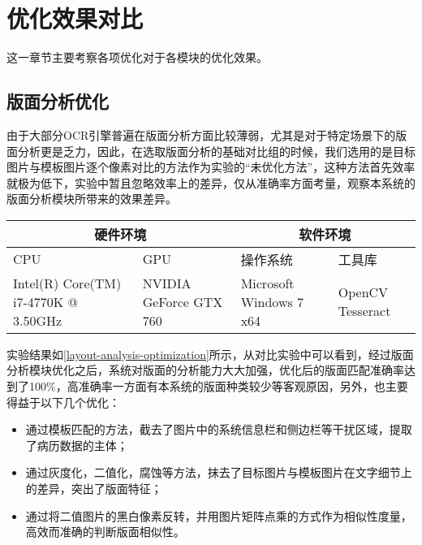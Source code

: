\section{优化效果对比}
这一章节主要考察各项优化对于各模块的优化效果。
\subsection{版面分析优化}
由于大部分OCR引擎普遍在版面分析方面比较薄弱，尤其是对于特定场景下的版面分析更是乏力，因此，在选取版面分析的基础对比组的时候，我们选用的是目标图片与模板图片逐个像素对比的方法作为实验的“未优化方法”，这种方法首先效率就极为低下，实验中暂且忽略效率上的差异，仅从准确率方面考量，观察本系统的版面分析模块所带来的效果差异。
\begin{table}[!htbp]
	\label{layout-analysis-optimization}
	\centering
	\vspace{10pt}
  \renewcommand\arraystretch{1.5}  %
	\begin{tabular}{p{3cm}|p{3cm}|p{3cm}|p{3cm}}
    \hline
    \multicolumn{2}{c|}{硬件环境} & \multicolumn{2}{c}{软件环境} \\
		\hline
    CPU&GPU&操作系统&工具库 \\
		\hline
    Intel(R) Core(TM)  i7-4770K @ 3.50GHz & NVIDIA GeForce  GTX 760 & Microsoft  Windows 7 x64 & OpenCV  Tesseract \\
    \hline
	\end{tabular}
\end{table}

实验结果如\autoref{layout-analysis-optimization}所示，从对比实验中可以看到，经过版面分析模块优化之后，系统对版面的分析能力大大加强，优化后的版面匹配准确率达到了100\%，高准确率一方面有本系统的版面种类较少等客观原因，另外，也主要得益于以下几个优化：
\begin{itemize}
  \item 通过模板匹配的方法，截去了图片中的系统信息栏和侧边栏等干扰区域，提取了病历数据的主体；
  \item 通过灰度化，二值化，腐蚀等方法，抹去了目标图片与模板图片在文字细节上的差异，突出了版面特征；
  \item 通过将二值图片的黑白像素反转，并用图片矩阵点乘的方式作为相似性度量，高效而准确的判断版面相似性。
\end{itemize}

